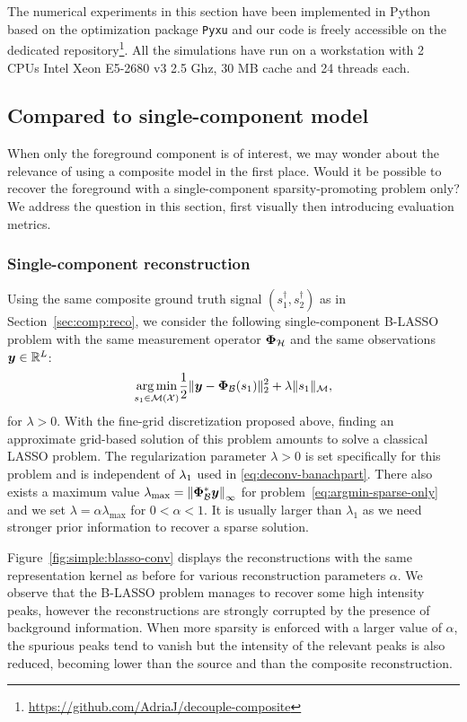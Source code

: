 \documentclass[12pt]{article}
\begin{document}
    The numerical experiments in this section have been implemented in Python based on the optimization package \texttt{Pyxu} \cite{pyxu-framework} and our code is freely accessible on the dedicated repository\footnote{\url{https://github.com/AdriaJ/decouple-composite}}. All the simulations have run on a workstation with 2 CPUs Intel Xeon E5-2680 v3 \@2.5 Ghz, 30 MB cache and 24 threads each. 

    \subsection{Compared to single-component model}
    \label{sec:bene:comp}
        When only the foreground component is of interest, we may wonder about the relevance of using a composite model in the first place. Would it be possible to recover the foreground with a single-component sparsity-promoting problem only? We address the question in this section, first visually then introducing evaluation metrics.

        \subsubsection{Single-component reconstruction}
        Using the same composite ground truth signal $(s_1^\dagger, s_2^\dagger)$ as in Section~\ref{sec:comp:reco}, we consider the following single-component B-LASSO problem with the same measurement operator $\bm{\Phi}_\mathcal{H}$ and the same observations $\bm{y}\in\mathbb{R}^L$:
        \begin{equation}
            \label{eq:argmin-sparse-only}
            \underset{s_1 \in {\mathcal{M}}({\mathcal{X}})}{\arg\min} \frac{1}{2} \| \bm{y} - \bm{\Phi}_\mathcal{B} (s_1) \|_2^2  + \lambda \| s_1 \|_{\mathcal{M}},
        \end{equation}
        for $\lambda > 0$.
        With the fine-grid discretization proposed above, finding an approximate grid-based solution of this problem amounts to solve a classical LASSO problem. The regularization parameter $\lambda > 0$ is set specifically for this problem and is independent of $\lambda_{1}$ used in \eqref{eq:deconv-banachpart}. There also exists a maximum value $\lambda_\mathrm{max} = \left\lVert\bm{\Phi}_\mathcal{B}^*\bm{y}\right\rVert_\infty$ for problem~\eqref{eq:argmin-sparse-only} and we set $\lambda = \alpha \lambda_\mathrm{max}$ for $0 < \alpha < 1$. It is usually larger than $\lambda_1$ as we need stronger prior information to recover a sparse solution.
        
        Figure~\ref{fig:simple:blasso-conv} displays the reconstructions with the same representation kernel as before for various reconstruction parameters $\alpha$.
        We observe that the B-LASSO problem manages to recover some high intensity peaks, however the reconstructions are strongly corrupted by the presence of background information. When more sparsity is enforced with a larger value of $\alpha$, the spurious peaks tend to vanish but the intensity of the relevant peaks is also reduced, becoming lower than the source and than the composite reconstruction.
\end{document}
